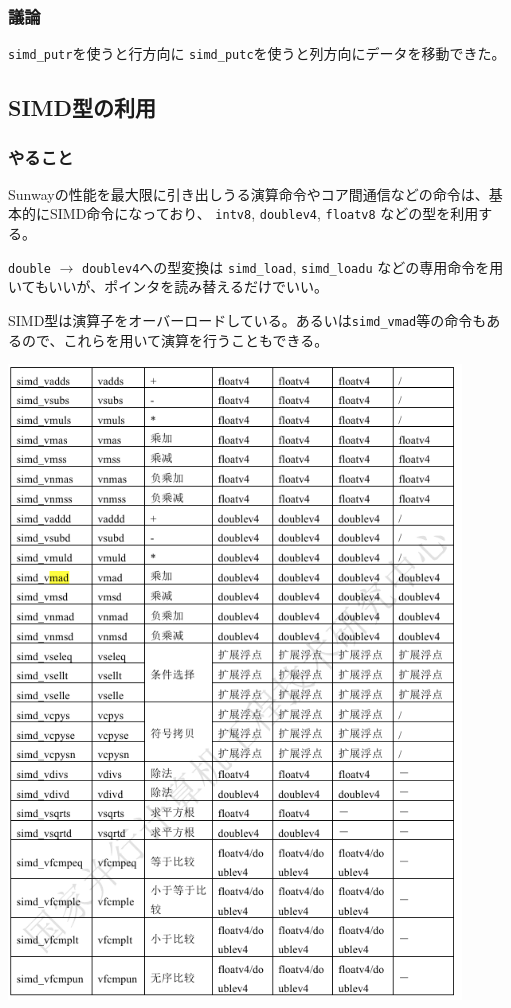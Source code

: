 \subsubsection{議論}


\verb`simd_putr`を使うと行方向に
\verb`simd_putc`を使うと列方向にデータを移動できた。


\subsection{SIMD型の利用}
\subsubsection{やること}

Sunwayの性能を最大限に引き出しうる演算命令やコア間通信などの命令は、基本的にSIMD命令になっており、
\verb`intv8`,
\verb`doublev4`,
\verb`floatv8`
などの型を利用する。

\verb`double` $\to$ \verb`doublev4`への型変換は
 \verb`simd_load`,  \verb`simd_loadu`
 などの専用命令を用いてもいいが、ポインタを読み替えるだけでいい。

 SIMD型は演算子をオーバーロードしている。あるいは\verb`simd_vmad`等の命令もあるので、これらを用いて演算を行うこともできる。
\begin{center}
  \includegraphics[width=12cm]{figure/sunway-simd.png}
  \end{center}

